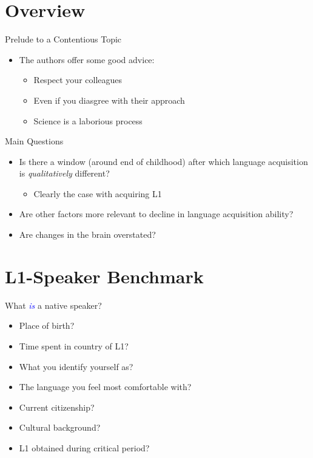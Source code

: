 \documentclass{beamer}
\begin{document}
\section{Overview}

\begin{frame}{Prelude to a Contentious Topic}
  \begin{itemize}
    \item The authors offer some good advice:
    \begin{itemize}
      \item Respect your colleagues
      \item Even if you diasgree with their approach
      \item Science is a laborious process
    \end{itemize}
  \end{itemize}
\end{frame}

\begin{frame}{Main Questions}
  \begin{itemize}
    \item Is there a window (around end of childhood) after which language acquisition is \emph{qualitatively} different?
    \begin{itemize}
      \item Clearly the case with acquiring L1
    \end{itemize}
    \item Are other factors more relevant to decline in language acquisition ability?
    \item Are changes in the brain overstated?
  \end{itemize}
\end{frame}

\section{L1-Speaker Benchmark}

\begin{frame}
	\centering
	\Huge{What \textcolor{blue}{\textit{is}} a native speaker?}
\end{frame}

\begin{frame}
	\begin{itemize}
		\item Place of birth?
		\pause
		\item Time spent in country of L1?
		\pause
		\item What you identify yourself as?
		\pause
		\item The language you feel most comfortable with?
		\pause
		\item Current citizenship?
		\pause
		\item Cultural background?
		\pause
		\item L1 obtained during critical period?
	\end{itemize}
\end{frame}
\end{document}
